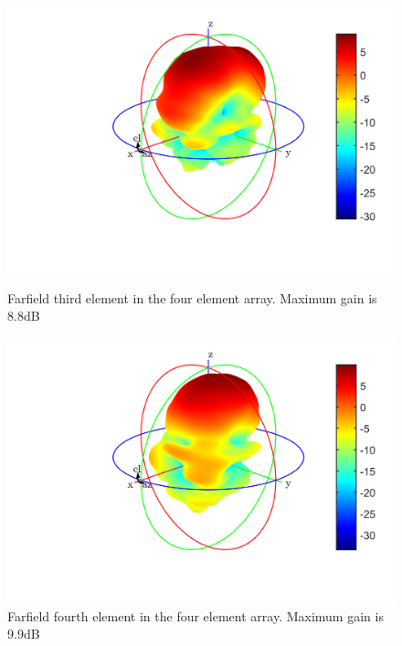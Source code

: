 \begin{figure}[H]
  \centering
  \begin{minipage}[b]{0.5\textwidth}
	\includegraphics[scale = 0.5]{figures/measurement/antennas/3rd_element_4_array.png}
	\caption{Farfield third element in the four element array. Maximum gain is 8.8dB}
    \label{fig:chamber_four_ant_ff_3}
  \end{minipage}
  \hfill
  \begin{minipage}[b]{0.4\textwidth}
\includegraphics[scale = 0.5]{figures/measurement/antennas/4th_element_4_array.png}
\caption{Farfield fourth element in the four element array. Maximum gain is 9.9dB}
    \label{fig:chamber_four_ant_ff_4}
  \end{minipage}
\end{figure}










